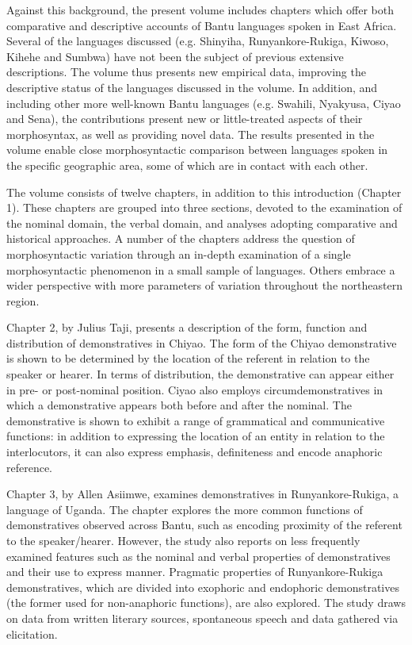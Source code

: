 \documentclass[output=paper]{langscibook}
\begin{document}
Against this background, the present volume includes chapters which offer both comparative and descriptive accounts of Bantu languages spoken in East Africa. Several of the languages discussed (e.g. Shinyiha, Runyankore-Rukiga, Kiwoso, Kihehe and Sumbwa) have not been the subject of previous extensive descriptions. The volume thus presents new empirical data, improving the descriptive status of the languages discussed in the volume. In addition, and including other more well-known Bantu languages (e.g. Swahili, Nyakyusa, Ciyao and Sena), the contributions present new or little-treated aspects of their morphosyntax, as well as providing novel data. The results presented in the volume enable close morphosyntactic comparison between languages spoken in the specific geographic area, some of which are in contact with each other. 

The volume consists of twelve chapters, in addition to this introduction (Chapter 1). These chapters are grouped into three sections, devoted to the examination of the nominal domain, the verbal domain, and analyses adopting comparative and historical approaches. A number of the chapters address the question of morphosyntactic variation through an in-depth examination of a single morphosyntactic phenomenon in a small sample of languages. Others embrace a wider perspective with more parameters of variation throughout the northeastern region.

Chapter 2, by Julius Taji, presents a description of the form, function and distribution of demonstratives in Chiyao. The form of the Chiyao demonstrative is shown to be determined by the location of the referent in relation to the speaker or hearer. In terms of distribution, the demonstrative can appear either in pre- or post-nominal position. Ciyao also employs circumdemonstratives in which a demonstrative appears both before and after the nominal. The demonstrative is shown to exhibit a range of grammatical and communicative functions: in addition to expressing the location of an entity in relation to the interlocutors, it can also express emphasis, definiteness and encode anaphoric reference.  

Chapter 3, by Allen Asiimwe, examines demonstratives in Runyankore-Ru\-ki\-ga, a language of Uganda. The chapter explores the more common functions of demonstratives observed across Bantu, such as encoding proximity of the referent to the speaker/hearer. However, the study also reports on less frequently examined features such as the nominal and verbal properties of demonstratives and their use to express manner. Pragmatic properties of Runyankore-Rukiga demonstratives, which are divided into exophoric and endophoric demonstratives (the former used for non-anaphoric functions), are also explored. The study draws on data from written literary sources, spontaneous speech and data gathered via elicitation.
\end{document}
